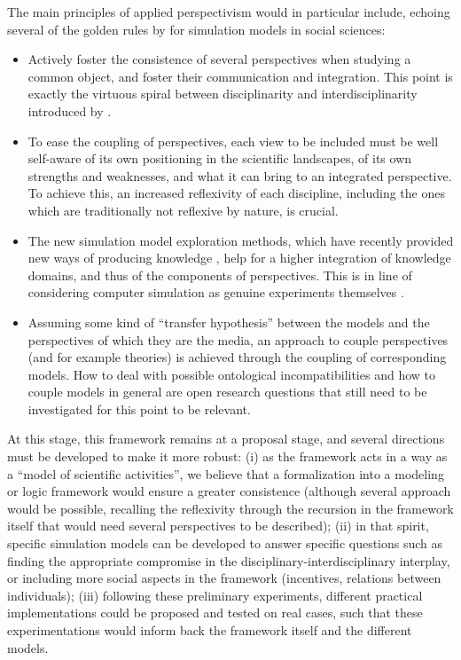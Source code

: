 \documentclass[graybox]{svmult}
\begin{document}
The main principles of applied perspectivism would in particular include, echoing several of the golden rules by \cite{banos2013pour} for simulation models in social sciences:

\begin{itemize}
	\item Actively foster the consistence of several perspectives when studying a common object, and foster their communication and integration. This point is exactly the virtuous spiral between disciplinarity and interdisciplinarity introduced by \cite{banos2013pour}.
	\item To ease the coupling of perspectives, each view to be included must be well self-aware of its own positioning in the scientific landscapes, of its own strengths and weaknesses, and what it can bring to an integrated perspective. To achieve this, an increased reflexivity of each discipline, including the ones which are traditionally not reflexive by nature, is crucial.
	\item The new simulation model exploration methods, which have recently provided new ways of producing knowledge \cite{pumain2017urban}, help for a higher integration of knowledge domains, and thus of the components of perspectives. This is in line of considering computer simulation as genuine experiments themselves \cite{boge2019computer}.
	\item Assuming some kind of ``transfer hypothesis'' between the models and the perspectives of which they are the media, an approach to couple perspectives (and for example theories) is achieved through the coupling of corresponding models. How to deal with possible ontological incompatibilities and how to couple models in general are open research questions that still need to be investigated for this point to be relevant.
\end{itemize}


At this stage, this framework remains at a proposal stage, and several directions must be developed to make it more robust: (i) as the framework acts in a way as a ``model of scientific activities'', we believe that a formalization into a modeling or logic framework would ensure a greater consistence (although several approach would be possible, recalling the reflexivity through the recursion in the framework itself that would need several perspectives to be described); (ii) in that spirit, specific simulation models can be developed to answer specific questions such as finding the appropriate compromise in the disciplinary-interdisciplinary interplay, or including more social aspects in the framework (incentives, relations between individuals); (iii) following these preliminary experiments, different practical implementations could be proposed and tested on real cases, such that these experimentations would inform back the framework itself and the different models.
\end{document}

